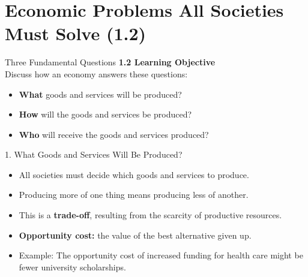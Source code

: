 \documentclass[aspectratio=169]{beamer}
\begin{document}
\section{Economic Problems All Societies Must Solve (1.2)}

\begin{frame}{Three Fundamental Questions}
\transfade
\textbf{1.2 Learning Objective}\\[0.3em]
Discuss how an economy answers these questions:
\begin{itemize}[<+->]
  \item \textbf{What} goods and services will be produced?
  \item \textbf{How} will the goods and services be produced?
  \item \textbf{Who} will receive the goods and services produced?
\end{itemize}
\end{frame}

\begin{frame}{1. What Goods and Services Will Be Produced?}
\transfade
\begin{itemize}[<+->]
  \item All societies must decide which goods and services to produce.
  \item Producing more of one thing means producing less of another.
  \item This is a \textbf{trade-off}, resulting from the scarcity of productive resources.
  \item \textbf{Opportunity cost:} the value of the best alternative given up.
  \item Example: The opportunity cost of increased funding for health care might be fewer university scholarships.
\end{itemize}
\end{frame}
\end{document}
